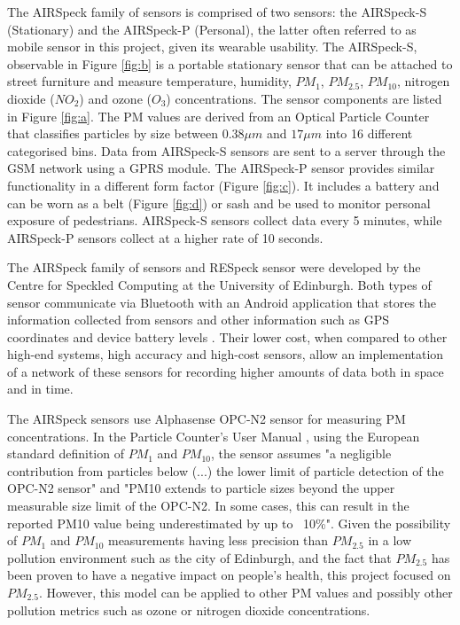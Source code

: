 The AIRSpeck family of sensors \cite{airspeck_family} is comprised of two sensors: the AIRSpeck-S (Stationary) and the AIRSpeck-P (Personal), the latter often referred to as mobile sensor in this project, given its wearable usability. The AIRSpeck-S, observable in Figure \ref{fig:b} is a portable stationary sensor that can be attached to street furniture and measure temperature, humidity, $PM_1$, $PM_{2.5}$, $PM_{10}$, nitrogen dioxide ($NO_2$) and ozone ($O_3$) concentrations. The sensor components are listed in Figure \ref{fig:a}. The PM values are derived from an Optical Particle Counter that classifies particles by size between $0.38\mu m$ and $17 \mu m$ into 16 different categorised bins. Data from AIRSpeck-S sensors are sent to a server through the GSM network using a GPRS module. The AIRSpeck-P sensor provides similar functionality in a different form factor (Figure \ref{fig:c}). It includes a battery and can be worn as a belt (Figure \ref{fig:d}) or sash and be used to monitor personal exposure of pedestrians. AIRSpeck-S sensors collect data every 5 minutes, while AIRSpeck-P sensors collect at a higher rate of 10 seconds.

The AIRSpeck family of sensors and RESpeck sensor were developed by the Centre for Speckled Computing at the University of Edinburgh. Both types of sensor communicate via Bluetooth with an Android application that stores the information collected from sensors and other information such as GPS coordinates and device battery levels \cite{clinical_trials}. Their lower cost, when compared to other high-end systems, high accuracy and high-cost sensors, allow an implementation of a network of these sensors for recording higher amounts of data both in space and in time.

The AIRSpeck sensors use Alphasense OPC-N2 sensor for measuring PM concentrations. In the Particle Counter's User Manual \cite{alphasense}, using the European standard definition of $PM_1$ and $PM_{10}$, the sensor assumes "a negligible contribution from particles below (...) the lower limit of particle detection of the OPC-N2 sensor" and "PM10 extends to particle sizes beyond the upper measurable size limit of the OPC-N2. In some cases, this can result in the reported PM10 value being underestimated by up to ~10\%". Given the possibility of $PM_1$ and $PM_{10}$ measurements having less precision than $PM_{2.5}$ in a low pollution environment such as the city of Edinburgh, and the fact that $PM_{2.5}$ has been proven to have a negative impact on people's health, this project focused on $PM_{2.5}$. However, this model can be applied to other PM values and possibly other pollution metrics such as ozone or nitrogen dioxide concentrations.


